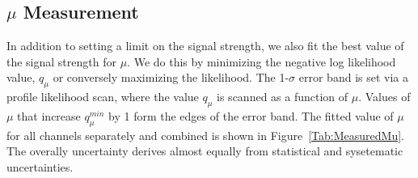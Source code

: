 \subsection{$\mu$ Measurement}

In addition to setting a limit on the signal strength, we also fit the best value of the signal strength for $\mu$. We do this by minimizing the negative log likelihood value, $q_{\mu}$ or conversely maximizing the likelihood. The 1-$\sigma$ error band is set via a profile likelihood scan, where the value $q_{\mu}$ is scanned as a function of $\mu$. Values of $\mu$ that increase $q^{min}_{\mu}$ by 1 form the edges of the error band. The fitted value of $\mu$ for all channels separately and combined is shown in Figure~\ref{Tab:MeasuredMu}. The overally uncertainty derives almost equally from statistical and sysetematic uncertainties.  

